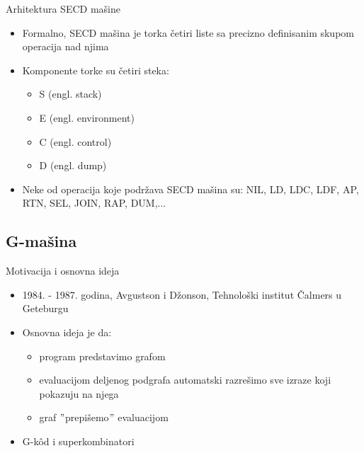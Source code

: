 \documentclass[xcolor={dvipsnames}, 11pt]{beamer}
\begin{document}
\begin{frame}{Arhitektura SECD mašine}
	\begin{itemize}
	\item Formalno, SECD mašina je torka četiri liste sa precizno definisanim skupom operacija nad njima
	\item Komponente torke su četiri steka: 
		\begin{itemize}
		\item S (engl. stack)
		\item E (engl. environment)
		\item C (engl. control)
		\item D	(engl. dump)
		\end{itemize}
	\item Neke od operacija koje podržava SECD mašina su: NIL, LD, LDC, LDF, AP, RTN, SEL, JOIN, RAP, DUM,...
	\end{itemize}
	
\end{frame}

\subsection{G-mašina}
\begin{frame}{Motivacija i osnovna ideja}
	\begin{itemize}
		\item 1984. - 1987. godina, Avgustson i Džonson, Tehnološki institut Čalmers u Geteburgu
		\item Osnovna ideja je da: 
			\begin{itemize}
			\item program predstavimo grafom
			\item evaluacijom deljenog podgrafa automatski razrešimo sve izraze koji pokazuju na njega
			\item graf $"$prepišemo$"$ evaluacijom
			\end{itemize}
		\item G-k\^od i superkombinatori	
	\end{itemize}
\end{frame}
\end{document}

